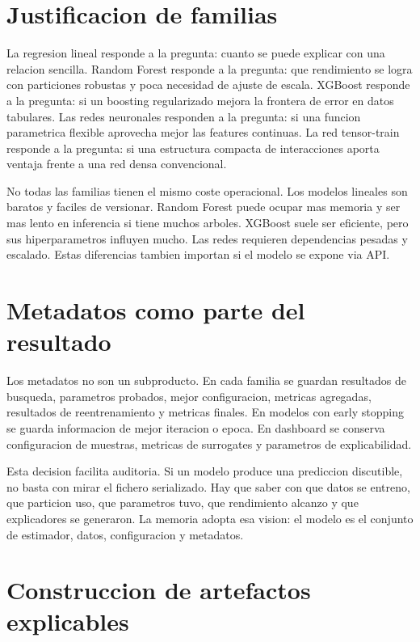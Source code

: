 \section{Justificacion de familias}

La regresion lineal responde a la pregunta: cuanto se puede explicar con una relacion sencilla. Random Forest responde a la pregunta: que rendimiento se logra con particiones robustas y poca necesidad de ajuste de escala. XGBoost responde a la pregunta: si un boosting regularizado mejora la frontera de error en datos tabulares. Las redes neuronales responden a la pregunta: si una funcion parametrica flexible aprovecha mejor las features continuas. La red tensor-train responde a la pregunta: si una estructura compacta de interacciones aporta ventaja frente a una red densa convencional.

No todas las familias tienen el mismo coste operacional. Los modelos lineales son baratos y faciles de versionar. Random Forest puede ocupar mas memoria y ser mas lento en inferencia si tiene muchos arboles. XGBoost suele ser eficiente, pero sus hiperparametros influyen mucho. Las redes requieren dependencias pesadas y escalado. Estas diferencias tambien importan si el modelo se expone via API.

\section{Metadatos como parte del resultado}

Los metadatos no son un subproducto. En cada familia se guardan resultados de busqueda, parametros probados, mejor configuracion, metricas agregadas, resultados de reentrenamiento y metricas finales. En modelos con early stopping se guarda informacion de mejor iteracion o epoca. En dashboard se conserva configuracion de muestras, metricas de surrogates y parametros de explicabilidad.

Esta decision facilita auditoria. Si un modelo produce una prediccion discutible, no basta con mirar el fichero serializado. Hay que saber con que datos se entreno, que particion uso, que parametros tuvo, que rendimiento alcanzo y que explicadores se generaron. La memoria adopta esa vision: el modelo es el conjunto de estimador, datos, configuracion y metadatos.

\section{Construccion de artefactos explicables}

